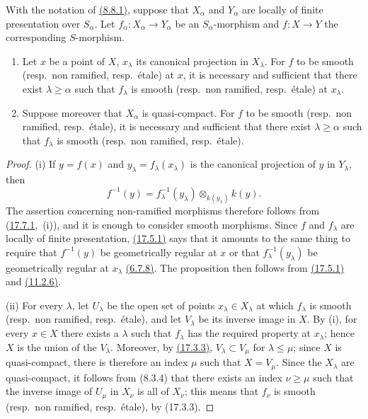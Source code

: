 \begin{proposition}[17.7.8]
\label{IV.17.7.8}
With the notation of {\hyperlink{ega4.c04.statement.8-8-1}{(8.8.1)}}, suppose that $X_\alpha$ and $Y_\alpha$ are locally of finite presentation over $S_\alpha$.
Let $f_\alpha:X_\alpha\to Y_\alpha$ be an $S_\alpha$-morphism and $f:X\to Y$ the corresponding $S$-morphism.
\begin{enumerate}[label=(\roman*)]
  \item Let $x$ be a point of $X$, $x_\lambda$ its canonical projection in $X_\lambda$.
  For $f$ to be smooth (resp.\ non ramified, resp.\ \'etale) at $x$, it is necessary and sufficient that there exist $\lambda\geq\alpha$ such that $f_\lambda$ is smooth (resp.\ non ramified, resp.\ \'etale) at $x_\lambda$.
  \item Suppose moreover that $X_\alpha$ is quasi-compact.
  For $f$ to be smooth (resp.\ non ramified, resp.\ \'etale), it is necessary and sufficient that there exist $\lambda\geq\alpha$ such that $f_\lambda$ is smooth (resp.\ non ramified, resp.\ \'etale).
\end{enumerate}
\end{proposition}

\begin{proof}
(i) If $y=f(x)$ and $y_\lambda=f_\lambda(x_\lambda)$ is the canonical projection of $y$ in $Y_\lambda$, then
\[
f^{-1}(y)=f_\lambda^{-1}(y_\lambda)\otimes_{k(y_\lambda)}k(y).
\]
The assertion concerning non-ramified morphisms therefore follows from ({\hyperlink{ega4.c04.prop.17-7-1}{17.7.1}},~(i)), and it is enough to consider smooth morphisms.
Since $f$ and $f_\lambda$ are locally of finite presentation, {\hyperlink{ega4.c04.thm.17-5-1}{(17.5.1)}} says that it amounts to the same thing to require that $f^{-1}(y)$ be geometrically regular at $x$ or that $f_\lambda^{-1}(y_\lambda)$ be geometrically regular at $x_\lambda$ {\hyperlink{ega4.c04.cor.6-7-8}{(6.7.8)}}.
The proposition then follows from {\hyperlink{ega4.c04.thm.17-5-1}{(17.5.1)}} and {\hyperlink{ega4.c04.thm.11-2-6}{(11.2.6)}}.

(ii) For every $\lambda$, let $U_\lambda$ be the open set of points $x_\lambda\in X_\lambda$ at which $f_\lambda$ is smooth (resp.\ non ramified, resp.\ \'etale), and let $V_\lambda$ be its inverse image in $X$.
By (i), for every $x\in X$ there exists a $\lambda$ such that $f_\lambda$ has the required property at $x_\lambda$; hence $X$ is the union of the $V_\lambda$.
Moreover, by {\hyperlink{ega4.c04.prop.17-3-3}{(17.3.3)}}, $V_\lambda\subset V_\mu$ for $\lambda\leq\mu$; since $X$ is quasi-compact, there is therefore an index $\mu$ such that $X=V_\mu$.
Since the $X_\lambda$ are quasi-compact, it follows from (8.3.4) that there exists an index $\nu\geq\mu$ such that the inverse image of $U_\mu$ in $X_\nu$ is all of $X_\nu$; this means that $f_\nu$ is smooth (resp.\ non ramified, resp.\ \'etale), by (17.3.3).
\end{proof}

